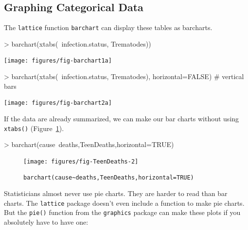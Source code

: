 \subsection{Graphing Categorical Data}

The \verb!lattice! function \verb!barchart! can display these tables as barcharts.
\begin{center}
\begin{Schunk}
\begin{Sinput}
> barchart(xtabs(~infection.status, Trematodes))
\end{Sinput}
\end{Schunk}
\texttt{[image: figures/fig-barchart1a]}
\begin{Schunk}
\begin{Sinput}
> barchart(xtabs(~infection.status, Trematodes), horizontal=FALSE)  # vertical bars
\end{Sinput}
\end{Schunk}
\texttt{[image: figures/fig-barchart2a]}
\end{center}

\vspace{-6mm}
If the data are already summarized, we can make our bar charts without using
\verb!xtabs()! (Figure~\ref{fig:TeenDeaths-barchart}).

\begin{Schunk}
\begin{Sinput}
> barchart(cause~deaths,TeenDeaths,horizontal=TRUE)
\end{Sinput}
\end{Schunk}
\begin{figure}
\begin{center}
\texttt{[image: figures/fig-TeenDeaths-2]}
\end{center}
\vspace{-8mm}
\caption{\texttt{barchart(cause\~{}deaths,TeenDeaths,horizontal=TRUE)}}
\label{fig:TeenDeaths-barchart}%
\end{figure}

\iffalse
Statisticians almost never use pie charts.  They are harder to read than bar charts.
The \verb!lattice! package doesn't even include a function to make pie charts.
But the \verb!pie()! function from the \verb!graphics!  package can make these
plots if you absolutely have to have one:

